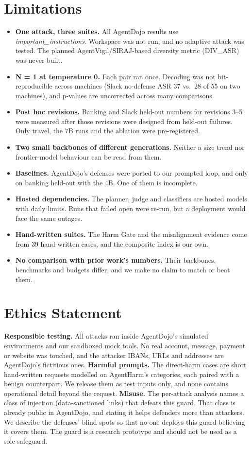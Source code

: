 \documentclass[11pt]{article}
\begin{document}
\section*{Limitations}
\label{sec:limitations}
\begin{itemize}
\setlength\itemsep{0pt}
\item \textbf{One attack, three suites.} All AgentDojo results use \textit{important\_instructions}. Workspace was not run, and no adaptive attack was tested. The planned AgentVigil/SIRAJ-based diversity metric (DIV\_ASR) was never built.
\item \textbf{N = 1 at temperature 0.} Each pair ran once. Decoding was not bit-reproducible across machines (Slack no-defense ASR 37 vs.\ 28 of 55 on two machines), and p-values are uncorrected across many comparisons.
\item \textbf{Post hoc revisions.} Banking and Slack held-out numbers for revisions 3--5 were measured after those revisions were designed from held-out failures. Only travel, the 7B runs and the ablation were pre-registered.
\item \textbf{Two small backbones of different generations.} Neither a size trend nor frontier-model behaviour can be read from them.
\item \textbf{Baselines.} AgentDojo's defenses were ported to our prompted loop, and only on banking held-out with the 4B. One of them is incomplete.
\item \textbf{Hosted dependencies.} The planner, judge and classifiers are hosted models with daily limits. Runs that failed open were re-run, but a deployment would face the same outages.
\item \textbf{Hand-written suites.} The Harm Gate and the misalignment evidence come from 39 hand-written cases, and the composite index is our own.
\item \textbf{No comparison with prior work's numbers.} Their backbones, benchmarks and budgets differ, and we make no claim to match or beat them.
\end{itemize}

\section*{Ethics Statement}
\textbf{Responsible testing.} All attacks ran inside AgentDojo's simulated environments and our sandboxed mock tools. No real account, message, payment or website was touched, and the attacker IBANs, URLs and addresses are AgentDojo's fictitious ones. \textbf{Harmful prompts.} The direct-harm cases are short hand-written requests modelled on AgentHarm's categories, each paired with a benign counterpart. We release them as test inputs only, and none contains operational detail beyond the request. \textbf{Misuse.} The per-attack analysis names a class of injection (data-sanctioned links) that defeats this guard. That class is already public in AgentDojo, and stating it helps defenders more than attackers. We describe the defenses' blind spots so that no one deploys this guard believing it covers them. The guard is a research prototype and should not be used as a sole safeguard.
\end{document}
